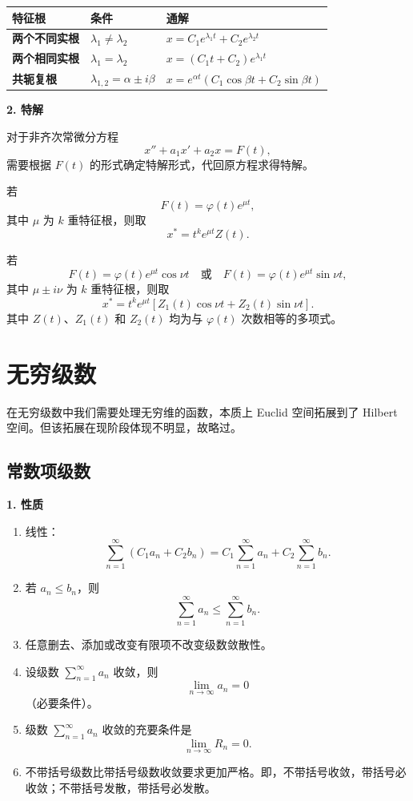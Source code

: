 \documentclass[UTF8,fontset=fandol,zihao=5]{ctexart}
\begin{document}
\begin{center}
\begin{tabularx}{\textwidth}{>{\bfseries}p{3cm}p{3.6cm}X}
\toprule
特征根 & 条件 & 通解 \\
\midrule
两个不同实根 & $\lambda_1\neq\lambda_2$ & $x=C_1e^{\lambda_1t}+C_2e^{\lambda_2t}$ \\
两个相同实根 & $\lambda_1=\lambda_2$ & $x=(C_1t+C_2)e^{\lambda_1t}$ \\
共轭复根 & $\lambda_{1,2}=\alpha\pm i\beta$ & $x=e^{\alpha t}(C_1\cos\beta t+C_2\sin\beta t)$ \\
\bottomrule
\end{tabularx}
\end{center}

\textbf{2. 特解}

对于非齐次常微分方程
\[
x''+a_1x'+a_2x=F(t),
\]
需要根据 $F(t)$ 的形式确定特解形式，代回原方程求得特解。

若
\[
F(t)=\varphi(t)e^{\mu t},
\]
其中 $\mu$ 为 $k$ 重特征根，则取
\[
x^*=t^ke^{\mu t}Z(t).
\]

若
\[
F(t)=\varphi(t)e^{\mu t}\cos\nu t
\quad\text{或}\quad
F(t)=\varphi(t)e^{\mu t}\sin\nu t,
\]
其中 $\mu\pm i\nu$ 为 $k$ 重特征根，则取
\[
x^*=t^ke^{\mu t}[Z_1(t)\cos\nu t+Z_2(t)\sin\nu t].
\]
其中 $Z(t)$、$Z_1(t)$ 和 $Z_2(t)$ 均为与 $\varphi(t)$ 次数相等的多项式。



\section{无穷级数}

在无穷级数中我们需要处理无穷维的函数，本质上 Euclid 空间拓展到了 Hilbert 空间。但该拓展在现阶段体现不明显，故略过。

\subsection{常数项级数}

\textbf{1. 性质}

\begin{enumerate}
  \item 线性：
  \[
  \sum_{n=1}^{\infty}(C_1a_n+C_2b_n)
  =C_1\sum_{n=1}^{\infty}a_n+C_2\sum_{n=1}^{\infty}b_n.
  \]
  \item 若 $a_n\leq b_n$，则
  \[
  \sum_{n=1}^{\infty}a_n\leq\sum_{n=1}^{\infty}b_n.
  \]
  \item 任意删去、添加或改变有限项不改变级数敛散性。
  \item 设级数 $\sum_{n=1}^{\infty}a_n$ 收敛，则
  \[
  \lim_{n\to\infty}a_n=0
  \]
  （必要条件）。
  \item 级数 $\sum_{n=1}^{\infty}a_n$ 收敛的充要条件是
  \[
  \lim_{n\to\infty}R_n=0.
  \]
  \item 不带括号级数比带括号级数收敛要求更加严格。即，不带括号收敛，带括号必收敛；不带括号发散，带括号必发散。
\end{enumerate}
\end{document}
